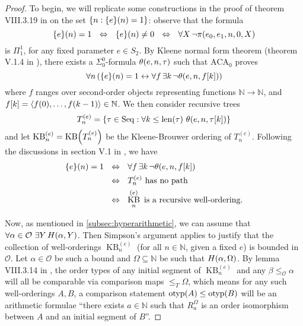 \documentclass[11pt]{article}
\theoremstyle{plain}
\theoremstyle{definition}
\newcommand{\tuple}[1]{\left\langle #1 \right\rangle}
\newcommand{\Seq}{\mathrm{Seq}}
\DeclareMathOperator{\otyp}{otyp}
\DeclareMathOperator{\KB}{KB}
\begin{document}
\begin{proof}
    To begin, we will replicate some constructions in the proof of theorem VIII.3.19 in \cite{simpson09-soa} on the set $\left\{n : \mleft\{e\mright\}\mleft(n\mright) = 1\right\}$: observe that the formula
    \[\mleft\{e\mright\}\mleft(n\mright) = 1 \ \ \Leftrightarrow \ \ \mleft\{e\mright\}\mleft(n\mright) \neq 0 \ \ \Leftrightarrow \ \ \forall X \, \neg \pi\mleft(e_0, e_1, n, 0, X\mright)\]
    is $\Pi^1_1$, for any fixed parameter $e \in S_2$. By Kleene normal form theorem (theorem V.1.4 in \cite{simpson09-soa}), there exists a $\Sigma^0_0$-formula $\theta\mleft(e, n, \tau\mright)$ such that $\mathrm{ACA}_0$ proves
    \[\forall n \left(\mleft\{e\mright\}\mleft(n\mright) = 1 \leftrightarrow \forall f \, \exists k \, \neg \theta\mleft(e, n, f\mleft[k\mright]\mright)\right)\]
    where $f$ ranges over second-order objects representing functions $\mathbb{N} \rightarrow \mathbb{N}$, and $f\mleft[k\mright] = \tuple{f\mleft(0\mright), \ldots, f\mleft(k - 1\mright)} \in \mathbb{N}$. We then consider recursive trees
    \[T^{(e)}_n = \left\{\tau \in \Seq : \forall k \leq \mathrm{len}\mleft(\tau\mright) \ \theta\mleft(e, n, \tau\mleft[k\mright]\mright)\right\}\]
    and let $\KB^{(e)}_n = \KB\mleft(T^{(e)}_n\mright)$ be the Kleene-Brouwer ordering of $T^{(e)}_n$. Following the discussions in section V.1 in \cite{simpson09-soa}, we have
    \begin{align*}
        \mleft\{e\mright\}\mleft(n\mright) = 1 \ \  & \Leftrightarrow \ \ \forall f \, \exists k \, \neg \theta\mleft(e, n, f\mleft[k\mright]\mright) \\
                                                    & \Leftrightarrow \ \ T^{(e)}_n \text{ has no path}                                               \\
                                                    & \Leftrightarrow \ \ \KB^{(e)}_n \text{ is a recursive well-ordering}.
    \end{align*}

    Now, as mentioned in \autoref{subsec:hyperarithmetic}, we can assume that $\forall \alpha \in \mathcal{O} \ \exists Y \, H\mleft(\alpha, Y\mright)$. Then Simpson's argument applies to justify that the collection of well-orderings $\KB^{(e)}_n$ (for all $n \in \mathbb{N}$, given a fixed $e$) is bounded in $\mathcal{O}$. Let $\alpha \in \mathcal{O}$ be such a bound and $\Omega \subseteq \mathbb{N}$ be such that $H\mleft(\alpha, \Omega\mright)$. By lemma VIII.3.14 in \cite{simpson09-soa}, the order types of any initial segment of $\KB^{(e)}_n$ and any $\beta \leq_\mathcal{O} \alpha$ will all be comparable via comparison maps $\leq_T \Omega$, which means for any such well-orderings $A, B$, a comparison statement $\otyp\mleft(A\mright) \leq \otyp\mleft(B\mright)$ will be an arithmetic formulae ``there exists $a \in \mathbb{N}$ such that $R^\Omega_a$ is an order isomorphism between $A$ and an initial segment of $B$''.


\end{proof}
\end{document}
